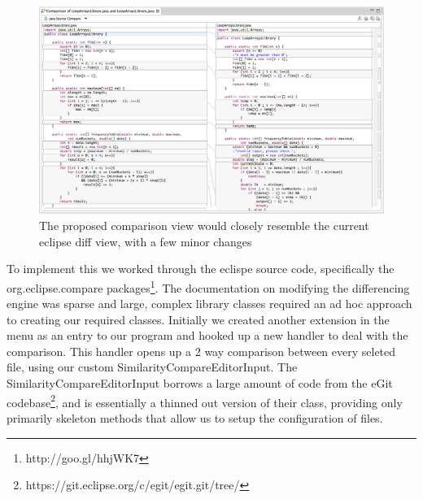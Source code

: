 \begin{figure}[H]
	\centering
		\includegraphics[width=\textwidth]{Figures/EclipseDiffView}
	\caption{The proposed comparison view would closely resemble the current eclipse
	diff view, with a few minor changes}
	\label{fig:diffView}
\end{figure}

To implement this we worked through the eclispe source code, specifically
the org.eclipse.compare packages\footnote{http://goo.gl/hhjWK7}. The documentation
on modifying the differencing engine was sparse and large, complex library 
classes required an ad hoc approach to creating our required classes.
Initially we created another extension in the menu as an entry to our program
and hooked up a new handler to deal with the comparison. This handler opens
up a 2 way comparison between every seleted file, using our custom 
SimilarityCompareEditorInput. The SimilarityCompareEditorInput borrows 
a large amount of code from the eGit
codebase\footnote{https://git.eclipse.org/c/egit/egit.git/tree/}, and is essentially a thinned out version of their
class, providing only primarily skeleton methods that allow us to setup the
configuration of files. 

